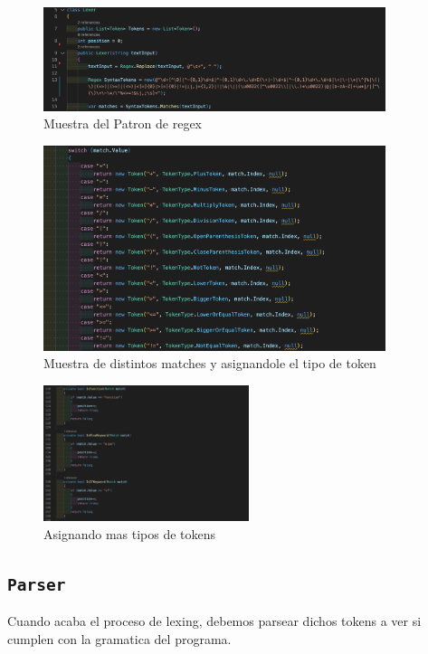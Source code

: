 \documentclass[a4paper, 12pt]{report}
\begin{document}
\begin{figure}[h]
    \center
    \includegraphics[width=10cm]{Pictures For Hulk/Figure1.png}
    \caption{Muestra del Patron de regex}
    \label{fig:logo}
\end{figure}

\begin{figure}[h]
    \center
    \includegraphics[width=10cm]{Pictures For Hulk/Figure2.png}
    \caption{Muestra de distintos matches y asignandole el tipo de token}
    \label{fig:logo}
\end{figure}

\begin{figure}[h]
    \center
    \includegraphics[width=6cm]{Pictures For Hulk/Figure3.png}
    \caption{Asignando mas tipos de tokens}
    \label{fig:logo}
\end{figure}

\subsection*{\tt Parser}

Cuando acaba el proceso de lexing, debemos parsear dichos tokens a ver si cumplen con la gramatica del programa.
\end{document}
